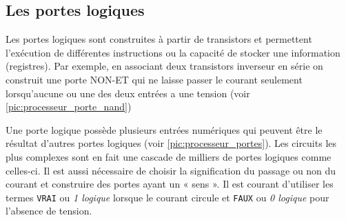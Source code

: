 \subsection{Les portes logiques}
    
    Les portes logiques sont construites à partir de transistors et permettent l'exécution de différentes instructions ou la capacité de stocker une information (registres). Par exemple, en associant deux transistors inverseur en série on construit une porte NON-ET qui ne laisse passer le courant seulement lorsqu'aucune ou une des deux entrées a une tension (voir \autoref{pic:processeur_porte_nand})



    Une porte logique possède plusieurs entrées numériques qui peuvent être le résultat d'autres portes logiques (voir \autoref{pic:processeur_portes}). Les circuits les plus complexes sont en fait une cascade de milliers de portes logiques comme celles-ci. Il est aussi nécessaire de choisir la signification du passage ou non du courant et construire des portes ayant un « sens ». Il est courant d’utiliser les termes \verb|VRAI| ou \textit{1 logique} lorsque le courant circule et \verb|FAUX| ou \textit{0 logique} pour l’absence de tension.
    
